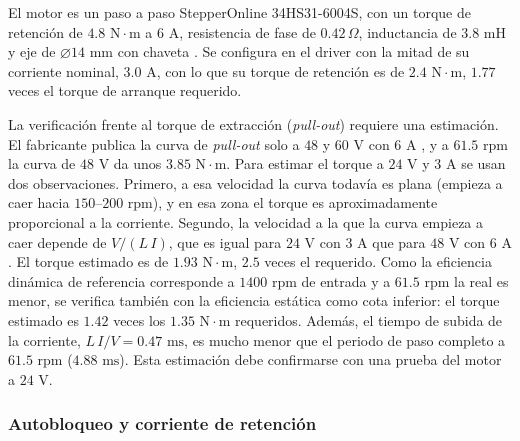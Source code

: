 \documentclass[../../General.tex]{subfiles}
\begin{document}
El motor es un paso a paso StepperOnline 34HS31-6004S, con un torque de retención de $4.8\text{ N}\cdot\text{m}$ a $6\text{ A}$, resistencia de fase de $0.42\,\Omega$, inductancia de $3.8\text{ mH}$ y eje de $\varnothing 14\text{ mm}$ con chaveta \citep{stepperonline_34hs31}. Se configura en el driver con la mitad de su corriente nominal, $3.0\text{ A}$, con lo que su torque de retención es de $2.4\text{ N}\cdot\text{m}$, $1.77$ veces el torque de arranque requerido.

La verificación frente al torque de extracción (\textit{pull-out}) requiere una estimación. El fabricante publica la curva de \textit{pull-out} solo a $48$ y $60\text{ V}$ con $6\text{ A}$ \citep{oyostepper_34hs31}, y a $61.5\text{ rpm}$ la curva de $48\text{ V}$ da unos $3.85\text{ N}\cdot\text{m}$. Para estimar el torque a $24\text{ V}$ y $3\text{ A}$ se usan dos observaciones. Primero, a esa velocidad la curva todavía es plana (empieza a caer hacia $150$--$200\text{ rpm}$), y en esa zona el torque es aproximadamente proporcional a la corriente. Segundo, la velocidad a la que la curva empieza a caer depende de $V/(L\,I)$, que es igual para $24\text{ V}$ con $3\text{ A}$ que para $48\text{ V}$ con $6\text{ A}$. El torque estimado es de $1.93\text{ N}\cdot\text{m}$, $2.5$ veces el requerido. Como la eficiencia dinámica de referencia corresponde a $1400\text{ rpm}$ de entrada y a $61.5\text{ rpm}$ la real es menor, se verifica también con la eficiencia estática como cota inferior: el torque estimado es $1.42$ veces los $1.35\text{ N}\cdot\text{m}$ requeridos. Además, el tiempo de subida de la corriente, $L\,I/V = 0.47\text{ ms}$, es mucho menor que el periodo de paso completo a $61.5\text{ rpm}$ ($4.88\text{ ms}$). Esta estimación debe confirmarse con una prueba del motor a $24\text{ V}$.

\subsubsection{Autobloqueo y corriente de retención}
\end{document}
